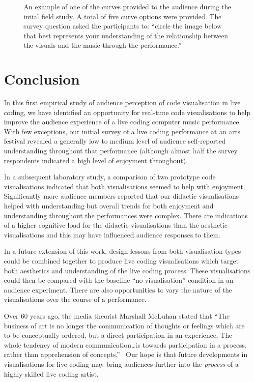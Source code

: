 \documentclass{sig-alternate}
\begin{document}
\begin{figure}
\centering
{}
\caption{An example of one of the curves provided to the audience
during the intial field study. A total of five curve options were
provided. The survey question asked the participants to: ``circle the
image below that best represents your understanding of the
relationship between the visuals and the music through the
performance.''}
\label{fig:understanding-over-time}
\end{figure}

\section{Conclusion}

In this first empirical study of audience perception of code
visualisation in live coding, we have identified an opportunity for
real-time code visualisations to help improve the audience experience
of a live coding computer music performance. With few exceptions, our
initial survey of a live coding performance at an arts festival
revealed a generally low to medium level of audience self-reported
understanding throughout that performance (although almost half the
survey respondents indicated a high level of enjoyment throughout).

In a subsequent laboratory study, a comparison of two prototype code
visualisations indicated that both visualisations seemed to help with
enjoyment. Significantly more audience members reported that our
didactic visualisations helped with understanding but overall trends
for both enjoyment and understanding throughout the performances were
complex. There are indications of a higher cognitive load for the
didactic visualisations than the aesthetic visualisations and this may
have influenced audience responses to them.

In a future extension of this work, design lessons from both
visualisation types could be combined together to produce live coding
visualisations which target both aesthetics and understanding of the
live coding process. These visualisations could then be compared with
the baseline ``no visualisation'' condition in an audience experiment.
There are also opportunities to vary the nature of the visualisations
over the course of a performance.

Over 60 years ago, the media theorist Marshall McLuhan stated that
``The business of art is no longer the communication of thoughts or
feelings which are to be conceptually ordered, but a direct
participation in an experience. The whole tendency of modern
communication\ldots is towards participation in a process, rather than
apprehension of concepts.''~\cite{McLuhan} Our hope is that future
developments in visualisations for live coding may bring audiences
further into the \emph{process} of a highly-skilled live coding
artist.
\end{document}
